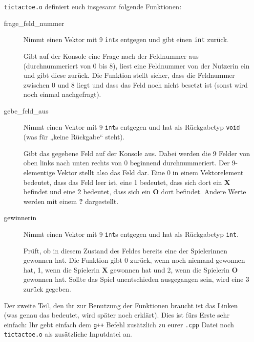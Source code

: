 \texttt{tictactoe.o} definiert euch insgesamt folgende Funktionen:
\begin{description}
	\item[frage\_feld\_nummer]
		Nimmt einen Vektor mit 9 \texttt{int}s entgegen und gibt einen \texttt{int} zurück.

		Gibt auf der Konsole eine Frage nach der Feldnummer aus (durchnummeriert von 0 bis 8), liest eine Feldnummer von der Nutzerin ein und gibt diese zurück.
		Die Funktion stellt sicher, dass die Feldnummer zwischen 0 und 8 liegt und dass das Feld noch nicht besetzt ist (sonst wird noch einmal nachgefragt).
	\item[gebe\_feld\_aus]
		Nimmt einen Vektor mit 9 \texttt{int}s entgegen und hat als Rückgabetyp \texttt{void} (was für „keine Rückgabe“ steht).

		Gibt das gegebene Feld auf der Konsole aus. Dabei werden die 9 Felder von oben links nach unten rechts von 0 beginnend durchnummeriert.
		Der 9-elementige Vektor stellt also das Feld dar.
		Eine 0 in einem Vektorelement bedeutet, dass das Feld leer ist, eine 1 bedeutet, dass sich dort ein \textbf{X} befindet und eine 2 bedeutet, dass sich ein \textbf{O} dort befindet.
		Andere Werte werden mit einem \textbf{?} dargestellt.
	\item[gewinnerin]
		Nimmt einen Vektor mit 9 \texttt{int}s entgegen und hat als Rückgabetyp \texttt{int}.

		Prüft, ob in diesem Zustand des Feldes bereits eine der Spielerinnen gewonnen hat.
		Die Funktion gibt 0 zurück, wenn noch niemand gewonnen hat, 1, wenn die Spielerin \textbf{X} gewonnen hat und 2, wenn die Spielerin \textbf{O} gewonnen hat.
		Sollte das Spiel unentschieden ausgegangen sein, wird eine 3 zurück gegeben.
\end{description}

Der zweite Teil, den ihr zur Benutzung der Funktionen braucht ist das Linken (was genau das bedeutet, wird später noch erklärt).
Dies ist fürs Erste sehr einfach: Ihr gebt einfach dem \texttt{g++} Befehl zusätzlich zu eurer \texttt{.cpp} Datei noch \texttt{tictactoe.o} als zusätzliche Inputdatei an.


